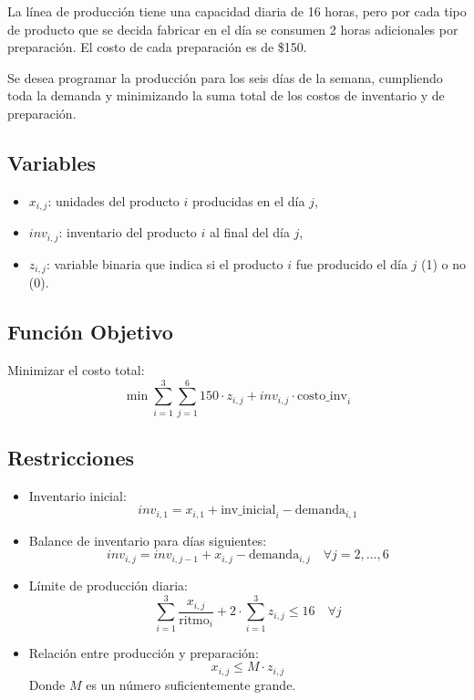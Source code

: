 \documentclass[12pt, a4paper, oneside]{book}
\theoremstyle{definition}
\begin{document}
La línea de producción tiene una capacidad diaria de 16 horas, pero por cada tipo de producto que se decida fabricar en el día se consumen 2 horas adicionales por preparación. El costo de cada preparación es de \$150.

Se desea programar la producción para los seis días de la semana, cumpliendo toda la demanda y minimizando la suma total de los costos de inventario y de preparación.

\subsection{Variables}

\begin{itemize}
    \item \(x_{i,j}\): unidades del producto \(i\) producidas en el día \(j\),
    \item \(inv_{i,j}\): inventario del producto \(i\) al final del día \(j\),
    \item \(z_{i,j}\): variable binaria que indica si el producto \(i\) fue producido el día \(j\) (1) o no (0).
\end{itemize}

\subsection{Función Objetivo}

Minimizar el costo total:
\[
\min \sum_{i=1}^{3} \sum_{j=1}^{6} 150 \cdot z_{i,j} + inv_{i,j} \cdot \text{costo\_inv}_i
\]

\subsection{Restricciones}

\begin{itemize}
    \item Inventario inicial:
    \[
    inv_{i,1} = x_{i,1} + \text{inv\_inicial}_i - \text{demanda}_{i,1}
    \]
    \item Balance de inventario para días siguientes:
    \[
    inv_{i,j} = inv_{i,j-1} + x_{i,j} - \text{demanda}_{i,j} \quad \forall j = 2, \dots, 6
    \]
    \item Límite de producción diaria:
    \[
    \sum_{i=1}^{3} \frac{x_{i,j}}{\text{ritmo}_i} + 2 \cdot \sum_{i=1}^{3} z_{i,j} \leq 16 \quad \forall j
    \]
    \item Relación entre producción y preparación:
    \[
    x_{i,j} \leq M \cdot z_{i,j}
    \]
    Donde \(M\) es un número suficientemente grande.
\end{itemize}
\end{document}
